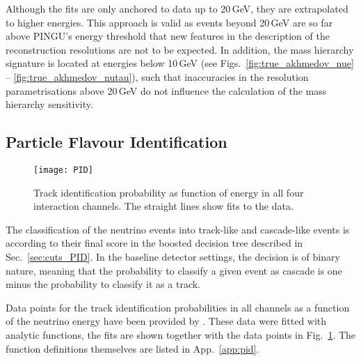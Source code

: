 Although the fits are only anchored to data up to 20\,GeV, they are extrapolated
to higher energies. This approach is valid as events beyond 20\,GeV are so far
above PINGU's energy threshold that new features in the description of the
reconstruction resolutions are not to be expected. In addition, the mass
hierarchy signature is located at energies below 10\,GeV (see
Figs.~\ref{fig:true_akhmedov_nue} -- \ref{fig:true_akhmedov_nutau}), such that
inaccuracies in the resolution parametrisations above 20\,GeV do not influence
the calculation of the mass hierarchy sensitivity.

\subsection{Particle Flavour Identification}
\label{sec:input_pid}

\begin{figure}[htbp]
 \centering
 \texttt{[image: PID]}
 \caption{Track identification probability as function of energy in all four
  interaction channels. The straight lines show fits to the data.}
 \label{fig:PID}
\end{figure}

\noindent
The classification of the neutrino events into track-like and cascade-like
events is according to their final score in the boosted decision tree described
in Sec.~\ref{sec:cuts_PID}. In the baseline detector settings, the decision is
of binary nature, meaning that the probability to classify a given event as
cascade is one minus the probability to classify it as a track.

Data points for the track identification probabilities in all channels as a
function of the neutrino energy have been provided by \cite{JP_PID}. These data
were fitted with analytic functions, the fits are shown together with the data
points in Fig.~\ref{fig:PID}. The function definitions themselves are listed
in App.~\ref{app:pid}.